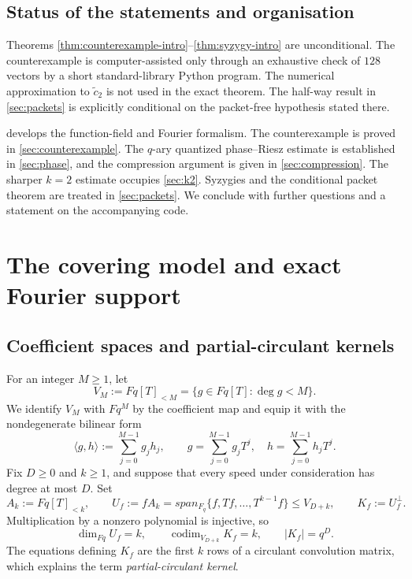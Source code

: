 \documentclass[11pt,reqno]{amsart}
\numberwithin{equation}{section}
\theoremstyle{definition}
\theoremstyle{remark}
\DeclareMathOperator{\codim}{codim}
\newcommand{\spanq}{\operatorname{span}_{\mathbb F_q}}
\newcommand{\Fq}{\mathbb F_q}
\newcommand{\abs}[1]{\lvert#1\rvert}
\newcommand{\angles}[1]{\langle#1\rangle}
\newcommand{\set}[1]{\{#1\}}
\def\Fq{Fq}%
\def\mathbb#1{#1}%
\def\operatorname#1{#1}%
\begin{document}
\subsection{Status of the statements and organisation}

Theorems \ref{thm:counterexample-intro}--\ref{thm:syzygy-intro} are unconditional.  The counterexample is computer-assisted only through an exhaustive check of $128$ vectors by a short standard-library Python program.  The numerical approximation to $\widetilde c_2$ is not used in the exact theorem.  The half-way result in \cref{sec:packets} is explicitly conditional on the packet-free hypothesis stated there.

 develops the function-field and Fourier formalism.  The counterexample is proved in \cref{sec:counterexample}.  The $q$-ary quantized phase--Riesz estimate is established in \cref{sec:phase}, and the compression argument is given in \cref{sec:compression}.  The sharper $k=2$ estimate occupies \cref{sec:k2}.  Syzygies and the conditional packet theorem are treated in \cref{sec:packets}.  We conclude with further questions and a statement on the accompanying code.

\section{The covering model and exact Fourier support}\label{sec:covering}

\subsection{Coefficient spaces and partial-circulant kernels}

For an integer $M\ge1$, let
\[
 V_M:=\Fq[T]_{<M}
 =\set{g\in\Fq[T]:\deg g<M}.
\]
We identify $V_M$ with $\Fq^M$ by the coefficient map and equip it with the nondegenerate bilinear form
\begin{equation}\label{eq:coefficient-pairing}
 \angles{g,h}
 :=\sum_{j=0}^{M-1}g_jh_j,
 \qquad
 g=\sum_{j=0}^{M-1}g_jT^j,
 \quad
 h=\sum_{j=0}^{M-1}h_jT^j.
\end{equation}
Fix $D\ge0$ and $k\ge1$, and suppose that every speed under consideration has degree at most $D$.  Set
\begin{equation}\label{eq:Uf-Kf}
 A_k:=\Fq[T]_{<k},
 \qquad
 U_f:=fA_k
 =\spanq\set{f,Tf,\ldots,T^{k-1}f}
 \le V_{D+k},
 \qquad
 K_f:=U_f^\perp.
\end{equation}
Multiplication by a nonzero polynomial is injective, so
\begin{equation}\label{eq:dimensions-U-K}
 \dim_{\Fq}U_f=k,
 \qquad
 \codim_{V_{D+k}}K_f=k,
 \qquad
 \abs{K_f}=q^D.
\end{equation}
The equations defining $K_f$ are the first $k$ rows of a circulant convolution matrix, which explains the term \emph{partial-circulant kernel}.
\end{document}
